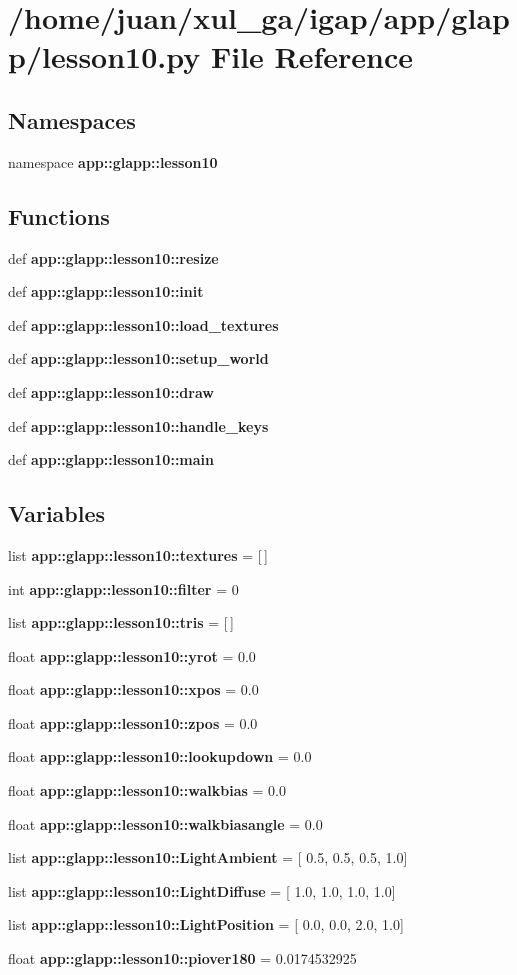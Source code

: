 \section{/home/juan/xul\_\-ga/igap/app/glapp/lesson10.py File Reference}
\label{lesson10_8py}
\subsection*{Namespaces}
\begin{CompactItemize}
\item 
namespace {\bf app::glapp::lesson10}
\end{CompactItemize}
\subsection*{Functions}
\begin{CompactItemize}
\item 
def {\bf app::glapp::lesson10::resize}
\item 
def {\bf app::glapp::lesson10::init}
\item 
def {\bf app::glapp::lesson10::load\_\-textures}
\item 
def {\bf app::glapp::lesson10::setup\_\-world}
\item 
def {\bf app::glapp::lesson10::draw}
\item 
def {\bf app::glapp::lesson10::handle\_\-keys}
\item 
def {\bf app::glapp::lesson10::main}
\end{CompactItemize}
\subsection*{Variables}
\begin{CompactItemize}
\item 
list {\bf app::glapp::lesson10::textures} = [$\,$]
\item 
int {\bf app::glapp::lesson10::filter} = 0
\item 
list {\bf app::glapp::lesson10::tris} = [$\,$]
\item 
float {\bf app::glapp::lesson10::yrot} = 0.0
\item 
float {\bf app::glapp::lesson10::xpos} = 0.0
\item 
float {\bf app::glapp::lesson10::zpos} = 0.0
\item 
float {\bf app::glapp::lesson10::lookupdown} = 0.0
\item 
float {\bf app::glapp::lesson10::walkbias} = 0.0
\item 
float {\bf app::glapp::lesson10::walkbiasangle} = 0.0
\item 
list {\bf app::glapp::lesson10::LightAmbient} = [ 0.5, 0.5, 0.5, 1.0]
\item 
list {\bf app::glapp::lesson10::LightDiffuse} = [ 1.0, 1.0, 1.0, 1.0]
\item 
list {\bf app::glapp::lesson10::LightPosition} = [ 0.0, 0.0, 2.0, 1.0]
\item 
float {\bf app::glapp::lesson10::piover180} = 0.0174532925
\end{CompactItemize}
